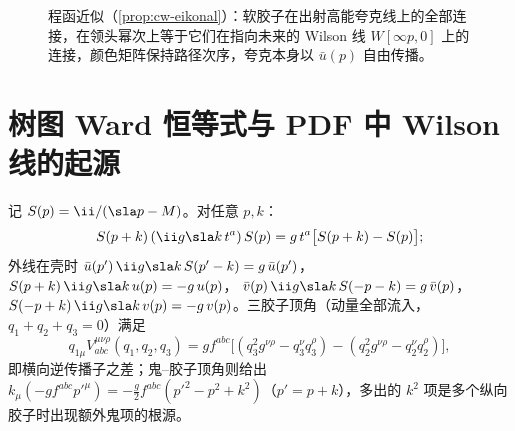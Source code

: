 \begin{figure}[htbp]
\centering
{}
\caption{程函近似（\cref{prop:cw-eikonal}）：软胶子在出射高能夸克线上的全部连接，在领头幂次上等于它们在指向未来的
Wilson 线 $W[\infty p,0]$ 上的连接，颜色矩阵保持路径次序，夸克本身以 $\bar u(p)$ 自由传播。}\label{fig:cw-eikonal}
\end{figure}

\section{树图 Ward 恒等式与 PDF 中 Wilson 线的起源}\label{sec:cw-ward}

\begin{lemma}\tagR\label{lem:cw-ward-elem}
记 $S(p)=\ii/(\sla p-M)$。对任意 $p,k$：
\begin{equation}\label{eq:cw-ward-elem}
S(p+k)\,(\ii g\sla k\,t^a)\,S(p)=g\,t^a\big[S(p+k)-S(p)\big];
\end{equation}
外线在壳时 $\bar u(p')\,\ii g\sla k\,S(p'-k)=g\,\bar u(p')$，$S(p+k)\,\ii g\sla k\,u(p)=-g\,u(p)$，
$\bar v(p)\,\ii g\sla k\,S(-p-k)=g\,\bar v(p)$，$S(-p+k)\,\ii g\sla k\,v(p)=-g\,v(p)$。三胶子顶角（动量全部流入，$q_1+q_2+q_3=0$）满足
\begin{equation}\label{eq:cw-ward-3g}
q_{1\mu}V^{\mu\nu\rho}_{abc}(q_1,q_2,q_3)=gf^{abc}\big[(q_3^2g^{\nu\rho}-q_3^\nu q_3^\rho)-(q_2^2g^{\nu\rho}-q_2^\nu q_2^\rho)\big],
\end{equation}
即横向逆传播子之差；鬼–胶子顶角则给出 $k_\mu(-gf^{abc}p'^\mu)=-\frac g2f^{abc}(p'^2-p^2+k^2)$（$p'=p+k$），多出的 $k^2$ 项是多个纵向胶子时出现额外鬼项的根源。
\end{lemma}


